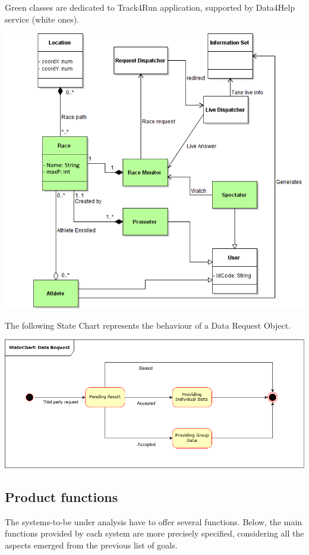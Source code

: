 \begin{minipage}{\textwidth}
{\color{LimeGreen} Green classes} are dedicated to {\color{LimeGreen} Track4Run} application, supported by Data4Help service (white ones).
\begin{center}
\includegraphics[scale=0.7]{Images/Class_Track4Run.png}
\\[1 cm]
\end{center}
The following State Chart represents the behaviour of a Data Request Object.
\begin{center}
\includegraphics[scale=0.5]{Images/StateChart.png}
\end{center}
\end{minipage}

\subsection{Product functions}
The systems-to-be under analysis have to offer several functions. Below, the main functions provided by each system are more precisely specified, considering all the aspects emerged from the previous list of goals.
